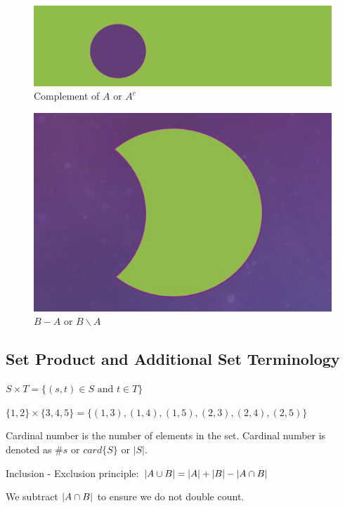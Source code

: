 \documentclass[12pt, titlepage, oneside]{article}
\begin{document}
\begin{figure}[h!]
	\centering
	\includegraphics[width=0.3\linewidth]{images/Ac}
	\caption{Complement of $A$ or $A^c$}
	\label{fig:ac}
\end{figure}
\newpage 
\begin{figure}[h!]
	\centering
	\includegraphics[width=0.3\linewidth]{images/B-A}
	\caption{$B-A$ or $B \backslash A$}
	\label{fig:b-a}
\end{figure}

\subsection{Set Product and Additional Set Terminology}

$S \times T = \{ (s,t) \in S \text{ and } t \in T\}$

\ex $\{1,2\} \times \{3,4,5\} = \{(1,3),(1,4),(1,5), (2,3), (2,4), (2,5)\}$

Cardinal number is the number of elements in the set. Cardinal number is denoted as $\#s$ or $card\{S\}$ or $|S|$.

Inclusion - Exclusion principle: $|A \cup B| = |A| + |B| - |A \cap B| $ 

We subtract $|A \cap B|$ to ensure we do not double count.
\end{document}
